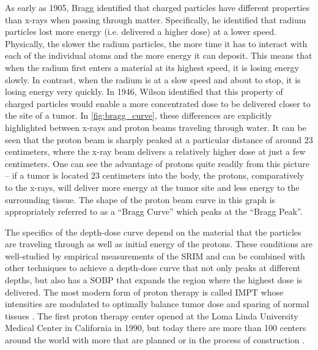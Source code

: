 As early as 1905, Bragg \cite{Bragg_1905_JOS} identified that charged particles have different properties than x-rays when passing through matter. Specifically, he identified that radium particles lost more energy (i.e. delivered a higher dose) at a lower speed. Physically, the slower the radium particles, the more time it has to interact with each of the individual atoms and the more energy it can deposit. This means that when the radium first enters a material at its highest speed, it is losing energy slowly. In contrast, when the radium is at a slow speed and about to stop, it is losing energy very quickly. In 1946, Wilson \cite{Wilson_1946_Rad} identified that this property of charged particles would enable a more concentrated dose to be delivered closer to the site of a tumor. In \autoref{fig:bragg_curve}, these differences are explicitly highlighted between x-rays and proton beams traveling through water. It can be seen that the proton beam is sharply peaked at a particular distance of around 23 centimeters, where the x-ray beam delivers a relatively higher dose at just a few centimeters. One can see the advantage of protons quite readily from this picture -- if a tumor is located 23 centimeters into the body, the protons, comparatively to the x-rays, will deliver more energy at the tumor site and less energy to the surrounding tissue. The shape of the proton beam curve in this graph is appropriately referred to as a ``Bragg Curve'' which peaks at the ``Bragg Peak''. 

The specifics of the depth-dose curve depend on the material that the particles are traveling through as well as initial energy of the protons. These conditions are well-studied by empirical measurements of the \gls{SRIM} \cite{Ziegler_2010_SRIM} and can be combined with other techniques to achieve a depth-dose curve that not only peaks at different depths, but also has a \gls{SOBP} that expands the region where the highest dose is delivered. The most modern form of proton therapy is called \gls{IMPT} whose intensities are modulated to optimally balance tumor dose and sparing of normal tissues \cite{Mohan_2022_PRO}. The first proton therapy center opened at the Loma Linda University Medical Center in California in 1990, but today there are more than 100 centers around the world with more that are planned or in the process of construction \cite{Mohan_2022_PRO}. 

